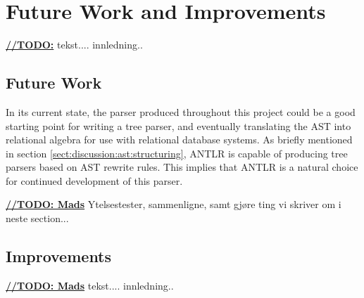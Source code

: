 \chapter{Future Work and Improvements}
\label{sect:summary:future_work}
\underline{\textbf{\LARGE //TODO:}} tekst.... innledning..


\section{Future Work}

In its current state, the parser produced throughout this project could be a good
starting point for writing a tree parser, and eventually translating the AST
into relational algebra for use with relational database systems. As briefly
mentioned in section \ref{sect:discussion:ast:structuring}, ANTLR is capable of
producing tree parsers based on AST rewrite rules. This implies that ANTLR is a
natural choice for continued development of this parser.



\underline{\textbf{\LARGE //TODO: Mads}} Ytelsestester, sammenligne, samt gj\o re ting vi skriver om i neste section...


\section{Improvements}
\label{sect:future:improvements}
\underline{\textbf{\LARGE //TODO: Mads}} tekst.... innledning..

